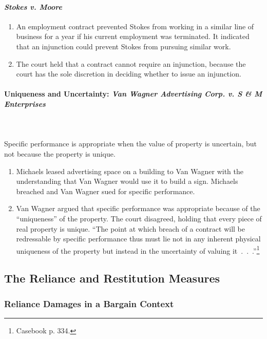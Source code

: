 \paragraph{\emph{Stokes v. Moore}}

\begin{enumerate}
    \item An employment contract prevented Stokes from working in a similar 
    line of business for a year if his current employment was terminated. It 
    indicated that an injunction could prevent Stokes from pursuing similar 
    work.
    \item The court held that a contract cannot require an injunction, because 
    the court has the sole discretion in deciding whether to issue an 
    injunction.
\end{enumerate}

\paragraph{Uniqueness and Uncertainty: \emph{Van Wagner Advertising Corp. v. S 
\& M Enterprises}}
~\\\\
Specific performance is appropriate when the value of property is uncertain, 
but not because the property is unique.

\begin{enumerate}
    \item Michaels leased advertising space on a building to Van Wagner with 
    the understanding that Van Wagner would use it to build a sign. Michaels 
    breached and Van Wagner sued for specific performance.
    \item Van Wagner argued that specific performance was appropriate because 
    of the ``uniqueness'' of the property. The court disagreed, holding that 
    every piece of real property is unique. ``The point at which breach of a 
    contract will be redressable by specific performance thus must lie not in 
    any inherent physical uniqueness of the property but instead in the 
    uncertainty of valuing it~.~.~.''\footnote{Casebook p. 334.}
\end{enumerate}

\subsection{The Reliance and Restitution Measures}

\subsubsection{Reliance Damages in a Bargain Context}

